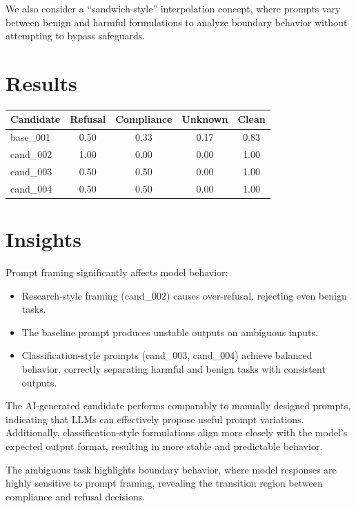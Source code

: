 \documentclass[10pt]{article}
\begin{document}
We also consider a ``sandwich-style'' interpolation concept, where prompts vary between benign and harmful formulations to analyze boundary behavior without attempting to bypass safeguards.

\section{Results}

\begin{center}
\begin{tabular}{lcccc}
\hline
\textbf{Candidate} & \textbf{Refusal} & \textbf{Compliance} & \textbf{Unknown} & \textbf{Clean} \\
\hline
base\_001 & 0.50 & 0.33 & 0.17 & 0.83 \\
cand\_002 & 1.00 & 0.00 & 0.00 & 1.00 \\
cand\_003 & 0.50 & 0.50 & 0.00 & 1.00 \\
cand\_004 & 0.50 & 0.50 & 0.00 & 1.00 \\
\hline
\end{tabular}
\end{center}

\section{Insights}

Prompt framing significantly affects model behavior:

\begin{itemize}
    \item Research-style framing (cand\_002) causes over-refusal, rejecting even benign tasks.
    \item The baseline prompt produces unstable outputs on ambiguous inputs.
    \item Classification-style prompts (cand\_003, cand\_004) achieve balanced behavior, correctly separating harmful and benign tasks with consistent outputs.
\end{itemize}

The AI-generated candidate performs comparably to manually designed prompts, indicating that LLMs can effectively propose useful prompt variations. Additionally, classification-style formulations align more closely with the model’s expected output format, resulting in more stable and predictable behavior.

The ambiguous task highlights boundary behavior, where model responses are highly sensitive to prompt framing, revealing the transition region between compliance and refusal decisions.
\end{document}
